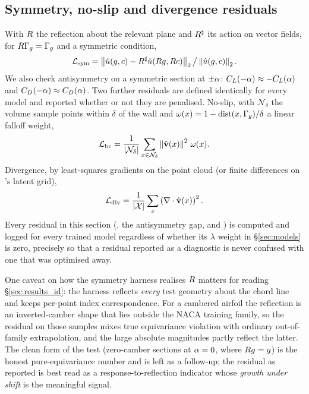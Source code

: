 \subsection{Symmetry, no-slip and divergence residuals}
With $R$ the reflection about the relevant plane and $R^{\sharp}$ its action
on vector fields, for $R\Gamma_{g} = \Gamma_{g}$ and a symmetric condition,
\begin{equation}
  \mathcal{L}_{\text{sym}} = \left\lVert \hat{u}(g,c) - R^{\sharp} \hat{u}(R g, R c) \right\rVert_2
             \big/ \left\lVert \hat{u}(g,c) \right\rVert_2 .
\end{equation}
We also check antisymmetry on a symmetric section at $\pm\alpha$:
$C_L(-\alpha) \approx -C_L(\alpha)$ and $C_D(-\alpha) \approx C_D(\alpha)$. Two further
residuals are defined identically for every model and reported whether or not
they are penalised. No-slip, with $\mathcal{N}_\delta$ the volume sample points
within $\delta$ of the wall and $\omega(x) = 1 - \mathrm{dist}(x,\Gamma_{g})/\delta$ a
linear falloff weight,
\begin{equation}
  \mathcal{L}_{\text{bc}} = \frac{1}{\left\lvert \mathcal{N}_\delta \right\rvert}
            \sum_{x \in \mathcal{N}_\delta} \left\lVert \hat{\mathbf{v}}(x) \right\rVert^2 \, \omega(x) .
\end{equation}
Divergence, by least-squares gradients on the point cloud (or finite differences
on \Mfno's latent grid),
\begin{equation}
  \mathcal{L}_{\text{div}} = \frac{1}{\left\lvert \mathcal{X} \right\rvert} \sum_{x} \left(\nabla \cdot \hat{\mathbf{v}}(x)\right)^2 .
\end{equation}
Every residual in this section (\Losssym, the antisymmetry gap, \Lossbc{} and
\Lossdiv) is computed and logged for every trained model regardless of
whether its $\lambda$ weight in \S\ref{sec:models} is zero, precisely so that a
residual reported as a diagnostic is never confused with one that was optimised
away.

One caveat on how the symmetry harness realises $R$ matters for reading
\S\ref{sec:results_id}: the harness reflects \emph{every} test geometry about
the chord line and keeps per-point index correspondence. For a cambered airfoil
the reflection is an inverted-camber shape that lies outside the NACA training
family, so the residual on those samples mixes true equivariance violation with
ordinary out-of-family extrapolation, and the large absolute magnitudes partly
reflect the latter. The clean form of the test (zero-camber sections at
$\alpha=0$, where $Rg=g$) is the honest pure-equivariance number and
is left as a follow-up; the residual as reported is best read as a
response-to-reflection indicator whose \emph{growth under shift} is the
meaningful signal.

